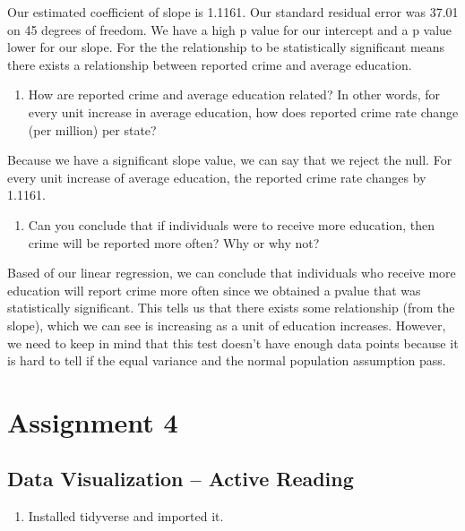 \documentclass[
]{article}
\providecommand{\tightlist}{%
  \setlength{\itemsep}{0pt}\setlength{\parskip}{0pt}}
\begin{document}
Our estimated coefficient of slope is 1.1161. Our standard residual
error was 37.01 on 45 degrees of freedom. We have a high p value for our
intercept and a p value lower for our slope. For the the relationship to
be statistically significant means there exists a relationship between
reported crime and average education.

\begin{enumerate}
\def\labelenumi{\arabic{enumi}.}
\setcounter{enumi}{5}
\tightlist
\item
  How are reported crime and average education related? In other words,
  for every unit increase in average education, how does reported crime
  rate change (per million) per state?
\end{enumerate}

Because we have a significant slope value, we can say that we reject the
null. For every unit increase of average education, the reported crime
rate changes by 1.1161.

\begin{enumerate}
\def\labelenumi{\arabic{enumi}.}
\setcounter{enumi}{6}
\tightlist
\item
  Can you conclude that if individuals were to receive more education,
  then crime will be reported more often? Why or why not?
\end{enumerate}

Based of our linear regression, we can conclude that individuals who
receive more education will report crime more often since we obtained a
pvalue that was statistically significant. This tells us that there
exists some relationship (from the slope), which we can see is
increasing as a unit of education increases. However, we need to keep in
mind that this test doesn't have enough data points because it is hard
to tell if the equal variance and the normal population assumption pass.

\hypertarget{assignment-4}{%
\section{Assignment 4}\label{assignment-4}}

\hypertarget{data-visualization-active-reading}{%
\subsection{Data Visualization -- Active
Reading}\label{data-visualization-active-reading}}

\begin{enumerate}
\def\labelenumi{\arabic{enumi}.}
\tightlist
\item
  Installed tidyverse and imported it.
\end{enumerate}
\end{document}
